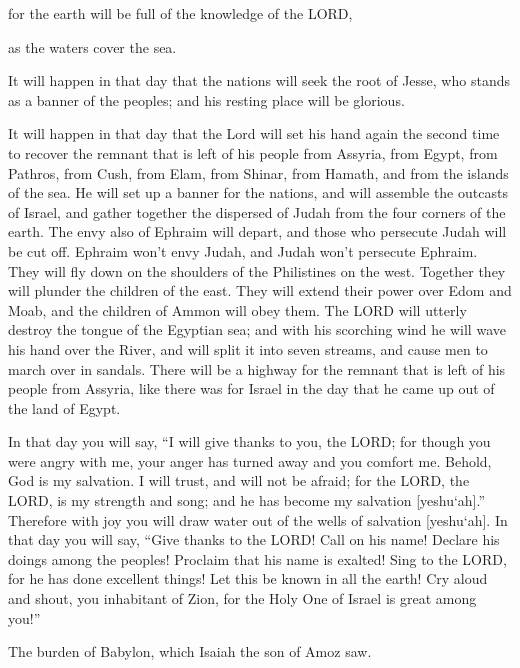 for the earth will be full of the knowledge of the LORD,

as the waters cover the sea.


\vspace{\baselineskip} \myverse{}It will happen in that day that the nations will seek the root
of Jesse, who stands as a banner of the peoples; and his resting place will be glorious.

\myverse{}It will happen in that day that the Lord will set his hand again
the second time to recover the remnant that is left of his people from Assyria, from Egypt, from Pathros,
from Cush, from Elam, from Shinar, from Hamath, and from the islands of the sea.
\myverse{}He will set up a banner for the nations, and will assemble the outcasts of
Israel, and gather together the dispersed of Judah from the four corners of the earth.
\myverse{}The envy also of Ephraim will depart, and those who persecute Judah will
be cut off. Ephraim won’t envy Judah, and Judah won’t persecute Ephraim.
\myverse{}They will fly down on the shoulders of the Philistines on the west. Together
they will plunder the children of the east. They will extend their power over Edom and Moab, and the children
of Ammon will obey them.
\myverse{}The LORD will utterly destroy the tongue of the Egyptian sea; and with his
scorching wind he will wave his hand over the River, and will split it into seven streams, and cause men
to march over in sandals.
\myverse{}There will be a highway for the remnant that is left of his people from Assyria,
like there was for Israel in the day that he came up out of the land of Egypt.


\mychapter{} \myverse*{}In that day you will say, “I will give thanks to you, the LORD;
for though you were angry with me, your anger has turned away and you comfort me.
\myverse{}Behold, God is my salvation. I will trust, and will not be afraid; for the
LORD, the LORD, is my strength and song; and he has become my salvation [yeshu`ah].”
\myverse{}Therefore with joy you will draw water out of the wells of salvation [yeshu`ah].
\myverse{}In that day you will say, “Give thanks to the LORD! Call on his name! Declare
his doings among the peoples! Proclaim that his name is exalted!
\myverse{}Sing to the LORD, for he has done excellent things! Let this be known in all
the earth!
\myverse{}Cry aloud and shout, you inhabitant of Zion, for the Holy One of Israel is
great among you!”


\mychapter{} \myverse*{}The burden of Babylon, which Isaiah the son of Amoz saw.

